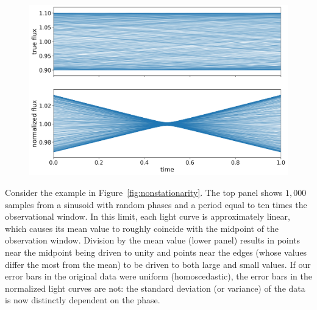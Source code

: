 \documentclass[modern]{aastex62}
\begin{document}
\begin{figure}[t!]
    \begin{centering}
        \includegraphics[width=\linewidth]{figures/nonstationarity.pdf}
    \end{centering}
\end{figure}

Consider the example in Figure~\ref{fig:nonstationarity}. The top panel
shows $1{,}000$ samples from a sinusoid with random phases and a period
equal to ten times the observational window.
%
In this limit, each light curve is approximately
linear, which causes its mean value to roughly coincide with the midpoint of the
observation window.
%
Division by the mean value (lower panel) results in points near the
midpoint being driven to unity and points near the edges (whose values differ
the most from the mean) to be driven to both large and small values.
%
If our error bars in the original data were uniform (homoscedastic),
the error bars in the normalized light curves are
not: the standard deviation (or variance) of the data is now
distinctly dependent on the phase.
\end{document}
